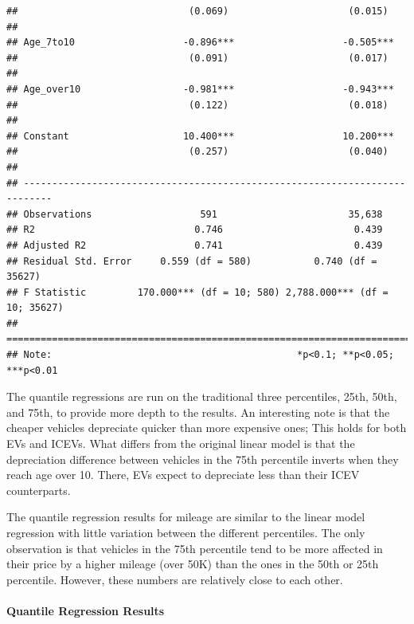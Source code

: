 \documentclass{article}
\begin{document}
\begin{verbatim}
##                              (0.069)                     (0.015)           
##                                                                            
## Age_7to10                   -0.896***                   -0.505***          
##                              (0.091)                     (0.017)           
##                                                                            
## Age_over10                  -0.981***                   -0.943***          
##                              (0.122)                     (0.018)           
##                                                                            
## Constant                    10.400***                   10.200***          
##                              (0.257)                     (0.040)           
##                                                                            
## ---------------------------------------------------------------------------
## Observations                   591                       35,638            
## R2                            0.746                       0.439            
## Adjusted R2                   0.741                       0.439            
## Residual Std. Error     0.559 (df = 580)           0.740 (df = 35627)      
## F Statistic         170.000*** (df = 10; 580) 2,788.000*** (df = 10; 35627)
## ===========================================================================
## Note:                                           *p<0.1; **p<0.05; ***p<0.01
\end{verbatim}

The quantile regressions are run on the traditional three percentiles,
25th, 50th, and 75th, to provide more depth to the results. An
interesting note is that the cheaper vehicles depreciate quicker than
more expensive ones; This holds for both EVs and ICEVs. What differs
from the original linear model is that the depreciation difference
between vehicles in the 75th percentile inverts when they reach age over
10. There, EVs expect to depreciate less than their ICEV counterparts.

The quantile regression results for mileage are similar to the linear
model regression with little variation between the different
percentiles. The only observation is that vehicles in the 75th
percentile tend to be more affected in their price by a higher mileage
(over 50K) than the ones in the 50th or 25th percentile. However, these
numbers are relatively close to each other.

\hypertarget{quantile-regression-results}{%
\paragraph{Quantile Regression
Results}\label{quantile-regression-results}}
\end{document}
